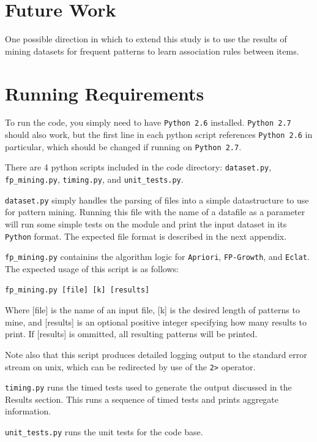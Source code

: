 \documentclass[11pt]{article}
\begin{document}
\begin{multicols}{2}
\section{Future Work}

One possible direction in which to extend this study is to use the
results of mining datasets for frequent patterns to learn association
rules between items. \cite{wiki_arl}

\appendix
\section{Running Requirements}

To run the code, you simply need to have \texttt{Python 2.6}
installed.  \texttt{Python 2.7} should also work, but the first line
in each python script references \texttt{Python 2.6} in particular,
which should be changed if running on \texttt{Python 2.7}.

There are 4 python scripts included in the code directory:
\texttt{dataset.py}, \texttt{fp\_mining.py}, \texttt{timing.py}, and
\texttt{unit\_tests.py}.

\texttt{dataset.py} simply handles the parsing of files into a simple
datastructure to use for pattern mining.  Running this file with the
name of a datafile as a parameter will run some simple tests on the
module and print the input dataset in its \texttt{Python} format.  The
expected file format is described in the next appendix.

\texttt{fp\_mining.py} containins the algorithm logic for
\texttt{Apriori}, \texttt{FP-Growth}, and \texttt{Eclat}.  The
expected usage of this script is as follows:

\texttt{fp\_mining.py [file] [k] [results]}

Where [file] is the name of an input file, [k] is the desired length
of patterns to mine, and [results] is an optional positive integer
specifying how many results to print.  If [results] is ommitted, all
resulting patterns will be printed.

Note also that this script produces detailed logging output to the
standard error stream on unix, which can be redirected by use of the
\texttt{2>} operator.

\texttt{timing.py} runs the timed tests used to generate the output
discussed in the Results section.  This runs a sequence
of timed tests and prints aggregate information.

\texttt{unit\_tests.py} runs the unit tests for the code base.


\end{multicols}
\end{document}
